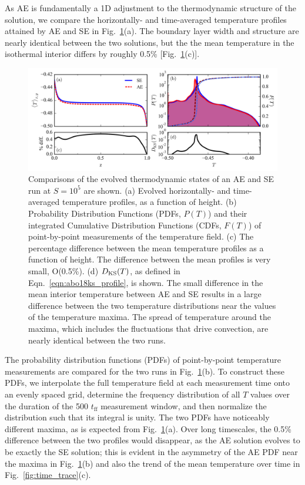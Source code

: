 As AE is fundamentally a 1D adjustment to the thermodynamic structure of the solution, we compare the horizontally- and time-averaged temperature profiles attained by AE and SE in Fig.~\ref{fig:temp_comparison}(a).  
The boundary layer width and structure are nearly identical between the two solutions, but the the mean temperature in the isothermal interior differs by roughly 0.5\% [Fig.~\ref{fig:temp_comparison}(c)]. 

\begin{figure}[ht!]
\includegraphics[width=\textwidth]{./figs/temp_comparison.pdf}
\caption[Evolved thermodynamic states of AE and SE simulations.]
{
	Comparisons of the evolved thermodynamic states of an AE and SE run at $S = 10^{5}$ are shown.  
	(a) Evolved horizontally- and time-averaged temperature profiles, as a function of height.
	(b) Probability Distribution Functions (PDFs, $P(T)$) and their integrated Cumulative Distribution Functions (CDFs, $F(T)$) of point-by-point measurements of the temperature field.
	(c) The percentage difference between the mean temperature profiles as a function of height.
	The difference between the mean profiles is very small, O(0.5\%).
	(d) $D_{\text{KS}}(T)$, as defined in Eqn.~\ref{eqn:abo18ks_profile}, is shown. 
	The small difference in the mean interior temperature between AE and SE results in a large difference between the two temperature distributions near the values of the temperature maxima.  
	The spread of temperature around the maxima, which includes the fluctuations that drive convection, are nearly identical between the two runs. 
	\label{fig:temp_comparison} 
}
\end{figure}

The probability distribution functions (PDFs) of point-by-point temperature measurements are compared for the two runs in Fig.~\ref{fig:temp_comparison}(b). 
To construct these PDFs, we interpolate the full temperature field at each measurement time onto an evenly spaced grid, determine the frequency distribution of all $T$ values over the duration of the 500 $t_{\text{ff}}$ measurement window, and then normalize the distribution such that its integral is unity.  
The two PDFs have noticeably different maxima, as is expected from Fig.~\ref{fig:temp_comparison}(a). 
Over long timescales, the 0.5\% difference between the two profiles would disappear, as the AE solution evolves to be exactly the SE solution; this is evident in the asymmetry of the AE PDF near the maxima in Fig.~\ref{fig:temp_comparison}(b) and also the trend of the mean temperature over time in Fig.~\ref{fig:time_trace}(c).

